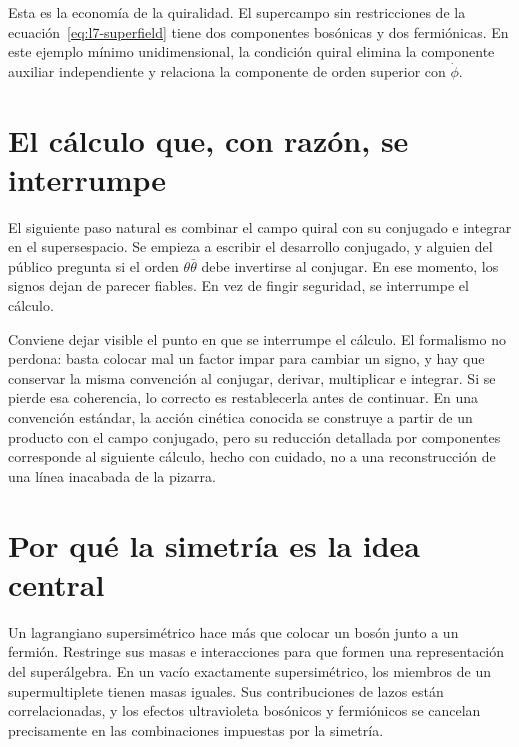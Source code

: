Esta es la economía de la quiralidad. El supercampo sin restricciones de la ecuación~\eqref{eq:l7-superfield} tiene dos componentes bosónicas y dos fermiónicas. En este ejemplo mínimo unidimensional, la condición quiral elimina la componente auxiliar independiente y relaciona la componente de orden superior con \(\dot\phi\).

\section{El cálculo que, con razón, se interrumpe}

El siguiente paso natural es combinar el campo quiral con su conjugado e integrar en el supersespacio. Se empieza a escribir el desarrollo conjugado, y alguien del público pregunta si el orden \(\theta\bar\theta\) debe invertirse al conjugar. En ese momento, los signos dejan de parecer fiables. En vez de fingir seguridad, se interrumpe el cálculo.

\begin{classroomqa}
\end{classroomqa}

Conviene dejar visible el punto en que se interrumpe el cálculo. El formalismo no perdona: basta colocar mal un factor impar para cambiar un signo, y hay que conservar la misma convención al conjugar, derivar, multiplicar e integrar. Si se pierde esa coherencia, lo correcto es restablecerla antes de continuar. En una convención estándar, la acción cinética conocida se construye a partir de un producto con el campo conjugado, pero su reducción detallada por componentes corresponde al siguiente cálculo, hecho con cuidado, no a una reconstrucción de una línea inacabada de la pizarra.

\section{Por qué la simetría es la idea central}

Un lagrangiano supersimétrico hace más que colocar un bosón junto a un fermión. Restringe sus masas e interacciones para que formen una representación del superálgebra. En un vacío exactamente supersimétrico, los miembros de un supermultiplete tienen masas iguales. Sus contribuciones de lazos están correlacionadas, y los efectos ultravioleta bosónicos y fermiónicos se cancelan precisamente en las combinaciones impuestas por la simetría.

